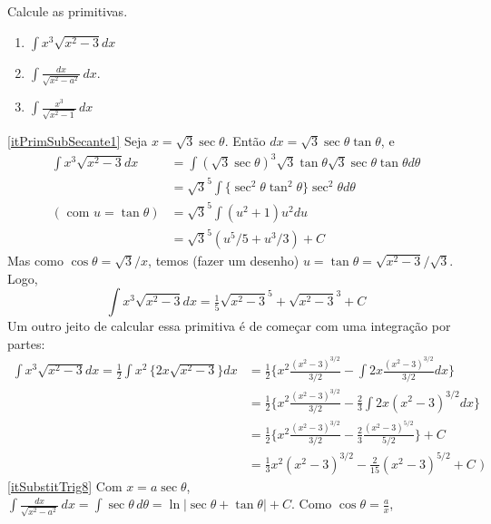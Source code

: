 \begin{exo} Calcule as primitivas.
\begin{multicols}{3}
\begin{enumerate}
\item\label{itPrimSubSecante1} $\int x^3\sqrt{x^2-3}dx$
\item\label{itSubstitTrig8} $\int \frac{dx}{\sqrt{x^2-a^2}}\,dx$.
\item\label{itSubstitTrig1} $\int\frac{x^3}{\sqrt{x^2-1}}\,dx$
\end{enumerate}
\end{multicols}
\vspace{0.01cm}
\begin{sol}
\eqref{itPrimSubSecante1}
Seja $x=\sqrt{3}\sec \theta$. Então $dx=\sqrt{3}\sec \theta\tan \theta$, e
\begin{align*}
 \int x^3\sqrt{x^2-3}dx&=\int (\sqrt{3}\sec \theta)^3 \sqrt{3}  \tan \theta
\sqrt{3}\sec \theta\tan \theta d\theta\\
&=\sqrt{3}^5\int \{\sec^2\theta \tan^2 \theta\}\sec^2 \theta d\theta\\
(\text{ com }u=\tan \theta)&=\sqrt{3}^5\int (u^2+1)u^2du\\
&=\sqrt{3}^5(u^5/5+u^3/3)+C
\end{align*}
Mas como $\cos \theta=\sqrt{3}/x$, temos (fazer um desenho) $u=\tan
\theta=\sqrt{x^2-3}/\sqrt{3}$. Logo,
$$
\int x^3\sqrt{x^2-3}dx=\tfrac15\sqrt{x^2-3}^5+\sqrt{x^2-3}^3+C
$$
Um outro jeito de calcular essa primitiva é de começar com uma integração por
partes:
\begin{align*}
\int x^3\sqrt{x^2-3}dx=
 \tfrac12\int x^2\,
\big\{2x\sqrt{x^2-3}\big\}dx&=\tfrac12\Big\{x^2\frac{(x^2-3)^{3/2}}{3/2}-\int
2x\frac{(x^2-3)^{3/2}}{3/2}dx\Big\}\\
&=\tfrac12\Big\{x^2\frac{(x^2-3)^{3/2}}{3/2}-\tfrac23\int
2x{(x^2-3)^{3/2}}dx\Big\}\\
&=\tfrac12\Big\{x^2\frac{(x^2-3)^{3/2}}{3/2}-\tfrac23\frac{(x^2-3)^{5/2}}{5/2}
\Big\}+C\\
&=\tfrac13x^2{(x^2-3)^{3/2}}-\tfrac{2}{15}{(x^2-3)^{5/2}}+C\,\,)
\end{align*}
\eqref{itSubstitTrig8} Com $x=a\sec\theta$, 
$\int
\frac{dx}{\sqrt{x^2-a^2}}\,dx=\int\sec\theta\,
d\theta=\ln|\sec\theta+\tan\theta|+C$. Como $\cos\theta=\frac{a}{x}$,
\begin{center}
\begin{bmlimage}
\end{bmlimage}
\end{center}
\end{sol}
\end{exo}
